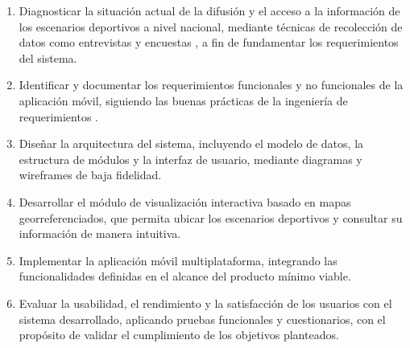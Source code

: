 \begin{enumerate}
  \item Diagnosticar la situaci\'on actual de la difusi\'on y el acceso
    a la informaci\'on de los escenarios deportivos a nivel nacional, mediante
    t\'ecnicas de recolecci\'on de datos como entrevistas y encuestas
    \citep{hernandez2014}, a fin de fundamentar los requerimientos del
    sistema.

  \item Identificar y documentar los requerimientos funcionales y no
    funcionales de la aplicaci\'on m\'ovil, siguiendo las buenas pr\'acticas de la
    ingenier\'ia de requerimientos \citep{sommerville2011}.

  \item Dise\~nar la arquitectura del sistema, incluyendo el modelo de
    datos, la estructura de m\'odulos y la interfaz de usuario, mediante
    diagramas y wireframes de baja fidelidad.

  \item Desarrollar el m\'odulo de visualizaci\'on interactiva basado en
    mapas georreferenciados, que permita ubicar los escenarios deportivos y
    consultar su informaci\'on de manera intuitiva.

  \item Implementar la aplicaci\'on m\'ovil multiplataforma, integrando las
    funcionalidades definidas en el alcance del producto m\'inimo viable.

  \item Evaluar la usabilidad, el rendimiento y la satisfacci\'on de los
    usuarios con el sistema desarrollado, aplicando pruebas funcionales y
    cuestionarios, con el prop\'osito de validar el cumplimiento de los
    objetivos planteados.
\end{enumerate}
